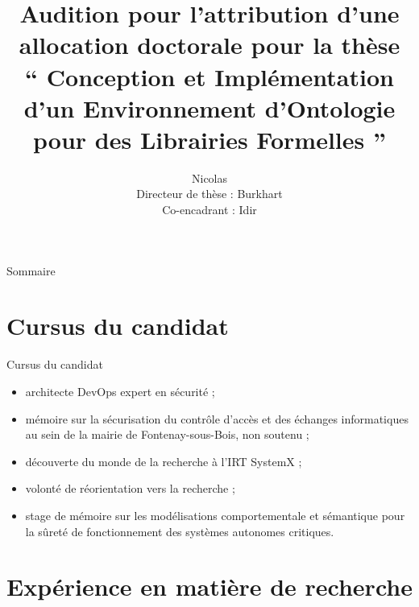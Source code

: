 \documentclass[
  hyperref={
    pdfusetitle,
    pdfencoding=auto,
    psdextra,
    colorlinks=true,
    linkcolor=darkblue,
    citecolor=darkred,
    urlcolor=darkblue,
  },
  9pt,
  aspectratio=169,
]{beamer}
\title{%
  Audition pour l'attribution d'une allocation doctorale pour la thèse%
  \texorpdfstring{\\}{}
  \texorpdfstring{%
  \enquote{%
    Conception et Implémentation d'un Environnement d'Ontologie
    pour des Librairies Formelles%
  }%
  }{%
    Conception et Implémentation d'un Environnement d'Ontologie
    pour des Librairies Formelles%
  }%
}
\author{%
  {\Large Nicolas \texorpdfstring{\bsc{Méric}}{Méric}}%
  \texorpdfstring{\\}{}
  Directeur de thèse : Burkhart \texorpdfstring{\bsc{Wolff}}{Wolff}%
  \texorpdfstring{\\}{}
  Co-encadrant : Idir \texorpdfstring{\bsc{Aït Sadoune}}{Aït Sadoune}%
}
\date{\frenchdate{2020}{06}{11}}
\begin{document}

\begin{frame}
  \titlepage{}
\end{frame}

\begin{frame}{Sommaire}
  \tableofcontents[hideallsubsections]{}
\end{frame}

\section{Cursus du candidat}

\begin{frame}{Cursus du candidat}
  \begin{itemize}
    \item
      architecte DevOps \textendash{} expert en sécurité ;
    \item
      mémoire sur la sécurisation
      du contrôle d'accès et des échanges informatiques
      au sein de la mairie de Fontenay-sous-Bois, non soutenu ;
    \item
      découverte du monde de la recherche à l'\gls{IRT} SystemX ;
    \item
      volonté de réorientation vers la recherche ;
    \item
      stage de mémoire sur
      les modélisations comportementale et sémantique pour
      la sûreté de fonctionnement des systèmes autonomes critiques.
  \end{itemize}
\end{frame}

\section{Expérience en matière de recherche}
\end{document}
